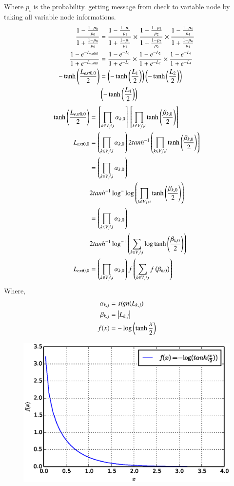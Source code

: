 \documentclass[journal,12pt,twocolumn]{IEEEtran}
\begin{document}
\begin{enumerate}
Where $p_i$ is the probability. getting message from check to variable node by taking all variable node informations.
\begin{align}
\frac{1-\frac{1-p_0}{p_0}}{1+\frac{1-p_0}{p_0}} & = \frac{1-\frac{1-p_1}{p_1}}{1+\frac{1-p_1}{p_1}} \times \frac{1-\frac{1-p_2}{p_2}}{1+\frac{1-p_2}{p_2}} \times \frac{1-\frac{1-p_4}{p_4}}{1+\frac{1-p_4}{p_4}}\\
\frac{1-e^{-L_{ext0,0}}}{1+e^{-L_{ext0,0}}} &=\frac{1-e^{-L_{1}}}{1+e^{-L_{1}}}\times \frac{1-e^{-L_{2}}}{1+e^{-L_{2}}} \times \frac{1-e^{-L_{4}}}{1+e^{-L_{4}}}\\ \nonumber
-\tanh \left(\frac{L_{ext0,0}}{2}\right)& =\left(-\tanh \left(\frac{L_{1}}{2}\right)\right)\left(-\tanh \left(\frac{L_{2}}{2}\right)\right)\\
&\left( -\tanh \left(\frac{L_{4}}{2}\right) \right)
\end{align}
\begin{align}
\tanh \left(\frac{L_{ext0,0}}{2}\right) &={}\left[\prod_{k \in V_j \setminus i}\alpha_{k,0}\right]{}\left[\prod_{k \in V_j \setminus i} \tanh \left(\frac{\beta_{k,0}}{2}\right)\right]\\
L_{ext0,0}  &=\left(\prod_{k \in V_j \setminus i}\alpha_{k,0}\right)2 tanh^{-1}\left(\prod_{k \in V_j \setminus i} \tanh \left(\frac{\beta_{k,0}}{2}\right)\right)\\
&=\left(\prod_{k \in V_j \setminus i}\alpha_{k,0}\right)\\
&2 tanh^{-1}\log^- \log\left(\prod_{k \in V_j \setminus i} \tanh \left(\frac{\beta_{k,0}}{2}\right)\right)\\
&=\left(\prod_{k \in V_j \setminus i}\alpha_{k,0}\right)\\
&2 tanh^{-1}\log^{-1}\left(\sum_{k \in V_j \setminus i} \log \tanh \left(\frac{\beta_{k,0}}{2}\right)\right)\\
L_{ext0,0}&=\left(\prod_{k \in V_j \setminus i}\alpha_{k,0}\right) f\left(\sum_{k \in V_j \setminus i}f\left(\beta_{k,0}\right)\right) \label{eq:main}
\end{align}
Where,
\begin{align}
\alpha_{k,j}&=sign(L_{k,j})\\
\beta_{k,j}&=\left\vert L_{k,j}\right\vert\\
f(x)&= - \log \left(\tanh{\frac{x}{2}}\right)
\end{align}
 \begin{figure}[!ht]
\begin{center}
\includegraphics[width=\columnwidth]{./figs/fxgraph}

\end{center}
\end{figure}
\end{enumerate}
\end{document}
